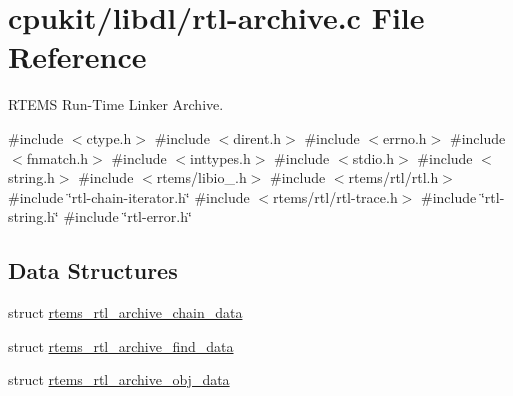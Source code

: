 \hypertarget{rtl-archive_8c}{}\section{cpukit/libdl/rtl-\/archive.c File Reference}
\label{rtl-archive_8c}


R\+T\+E\+MS Run-\/\+Time Linker Archive.  


{\ttfamily \#include $<$ctype.\+h$>$}\newline
{\ttfamily \#include $<$dirent.\+h$>$}\newline
{\ttfamily \#include $<$errno.\+h$>$}\newline
{\ttfamily \#include $<$fnmatch.\+h$>$}\newline
{\ttfamily \#include $<$inttypes.\+h$>$}\newline
{\ttfamily \#include $<$stdio.\+h$>$}\newline
{\ttfamily \#include $<$string.\+h$>$}\newline
{\ttfamily \#include $<$rtems/libio\+\_\+.\+h$>$}\newline
{\ttfamily \#include $<$rtems/rtl/rtl.\+h$>$}\newline
{\ttfamily \#include \char`\"{}rtl-\/chain-\/iterator.\+h\char`\"{}}\newline
{\ttfamily \#include $<$rtems/rtl/rtl-\/trace.\+h$>$}\newline
{\ttfamily \#include \char`\"{}rtl-\/string.\+h\char`\"{}}\newline
{\ttfamily \#include \char`\"{}rtl-\/error.\+h\char`\"{}}\newline
\subsection*{Data Structures}
\begin{DoxyCompactItemize}
\item 
struct \mbox{\hyperlink{structrtems__rtl__archive__chain__data}{rtems\+\_\+rtl\+\_\+archive\+\_\+chain\+\_\+data}}
\item 
struct \mbox{\hyperlink{structrtems__rtl__archive__find__data}{rtems\+\_\+rtl\+\_\+archive\+\_\+find\+\_\+data}}
\item 
struct \mbox{\hyperlink{structrtems__rtl__archive__obj__data}{rtems\+\_\+rtl\+\_\+archive\+\_\+obj\+\_\+data}}
\end{DoxyCompactItemize}
